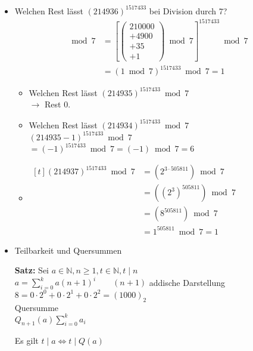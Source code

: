 \documentclass[a4paper, 12pt, twoside] {article}
\begin{document}
\begin{itemize}
 \item Welchen Rest lässt $(214936)^{1517433}$ bei Division durch 7?
 \begin{align*}
  [(214936)^{1517433}] \bmod 7 &=  \left[ \left(
  \begin{array}{r}
  210000\\
  + 4900 \\
  + 35 \\
  + 1 
  \end{array}\right) \bmod 7 \right]^{1517433} \bmod 7 \\
 							 &= (1 \bmod 7)^{1517433} \bmod 7 = 1
 \end{align*}

 \begin{itemize}
 \item Welchen Rest lässt $(214935)^{1517433} \bmod 7$ \\
 $\rightarrow$ Rest 0.

 \item Welchen Rest lässt $(214934)^{1517433} \bmod 7$ \\
 $(214935-1)^{1517433} \bmod 7$ \\
 $=(-1)^{1517433} \bmod 7 = (-1) \bmod 7 = 6$

 \item $\begin{aligned}[t]
(214937)^{1517433} \bmod 7 &=(2^{3 \cdot 505811}) \bmod 7 \\
						   &= ((2^3)^{505811}) \bmod 7 \\
						   &=(8^{505811}) \bmod 7  \\
						   &= 1^{505811} \bmod 7 = 1
\end{aligned}$

\end{itemize}

 \item Teilbarkeit und Quersummen

 \textbf{Satz:} Sei $ a \in \mathbb{N}, n \geq 1, t \in \mathbb{N}, t \mid n$ \\
$a = \displaystyle\sum^{k}_{i = 0} a (n+1)^i \qquad (n+1)$ addische Darstellung \\

$8 = 0 \cdot 2^0 + 0 \cdot 2^1 + 0 \cdot 2^2 = (1000)_2$ \\

Quersumme \\
$Q_{n+1} (a) \displaystyle\sum^{k}_{i=0} a_i$

Es gilt $t \mid a \Leftrightarrow t \mid Q(a)$


\end{itemize}
\end{document}
